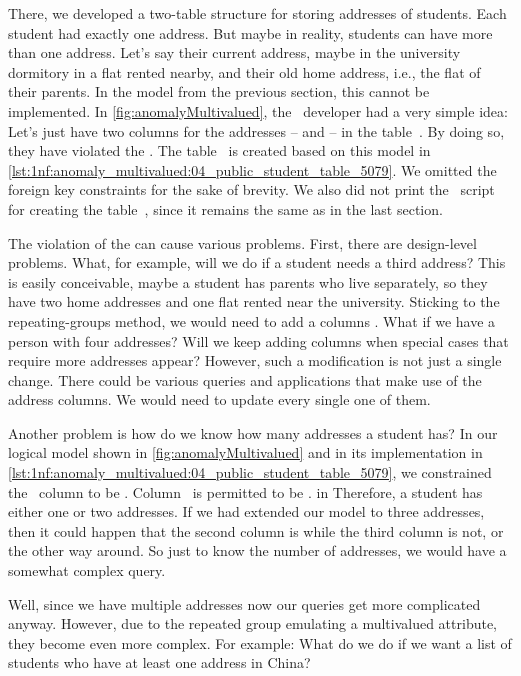 There, we developed a two-table structure for storing addresses of students.
Each student had exactly one address.
But maybe in reality, students can have more than one address.
Let's say their current address, maybe in the university dormitory in a flat rented nearby, and their old home address, i.e., the flat of their parents.
In the model from the previous section, this cannot be implemented.
In \cref{fig:anomalyMultivalued}, the \db\ developer had a very simple idea:
Let's just have two columns for the addresses --  and  -- in the table~.
By doing so, they have violated the .
The table~ is created based on this model in \cref{lst:1nf:anomaly_multivalued:04_public_student_table_5079}.
We omitted the foreign key  constraints for the sake of brevity.
We also did not print the \sql\ script for creating the table~, since it remains the same as in the last section.

The violation of the  can cause various problems.
First, there are design-level problems.
What, for example, will we do if a student needs a third address?
This is easily conceivable, maybe a student has parents who live separately, so they have two home addresses and one flat rented near the university.
Sticking to the repeating-groups method, we would need to add a columns .
What if we have a person with four addresses?
Will we keep adding columns when special cases that require more addresses appear?
However, such a modification is not just a single change.
There could be various queries and applications that make use of the address columns.
We would need to update every single one of them.

Another problem is how do we know how many addresses a student has?
In our logical model shown in \cref{fig:anomalyMultivalued} and in its implementation in \cref{lst:1nf:anomaly_multivalued:04_public_student_table_5079}, we constrained the ~column to be .
Column~ is permitted to be . in
Therefore, a student has either one or two addresses.
If we had extended our model to three addresses, then it could happen that the second column is  while the third column is not, or the other way around.
So just to know the number of addresses, we would have a somewhat complex query.

Well, since we have multiple addresses now our queries get more complicated anyway.
However, due to the repeated group emulating a multivalued attribute, they become even more complex.
For example:
What do we do if we want a list of students who have at least one address in China?

